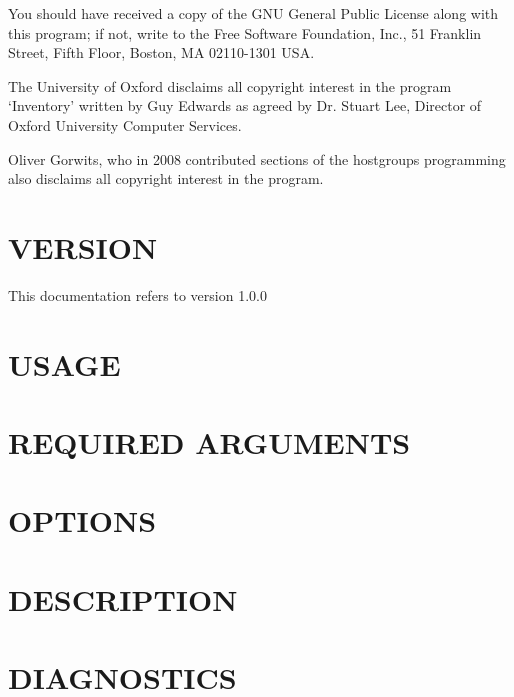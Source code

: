 \documentclass{book}
\begin{document}
You should have received a copy of the GNU General Public License along with this program; if not, write to the Free Software Foundation, Inc., 51 Franklin Street, Fifth Floor, Boston, MA 02110-1301 USA.



The University of Oxford disclaims all copyright interest in the program `Inventory' written by Guy Edwards as agreed by Dr. Stuart Lee, Director of Oxford University Computer Services.



Oliver Gorwits, who in 2008 contributed sections of the hostgroups programming also disclaims all copyright interest in the program.




\section{VERSION}
\label{_VERSION}
\hypertarget{_VERSION}{}



This documentation refers to version 1.0.0


\section{USAGE}
\label{_USAGE}
\hypertarget{_USAGE}{}


\section{REQUIRED ARGUMENTS}
\label{_REQUIRED_ARGUMENTS}
\hypertarget{_REQUIRED_ARGUMENTS}{}


\section{OPTIONS}
\label{_OPTIONS}
\hypertarget{_OPTIONS}{}


\section{DESCRIPTION}
\label{_DESCRIPTION}
\hypertarget{_DESCRIPTION}{}


\section{DIAGNOSTICS}
\label{_DIAGNOSTICS}
\hypertarget{_DIAGNOSTICS}{}
\end{document}
